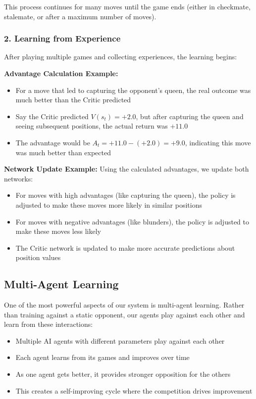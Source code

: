 \documentclass[11pt]{article}
\begin{document}
This process continues for many moves until the game ends (either in checkmate, stalemate, or after a maximum number of moves).

\subsubsection*{2. Learning from Experience}

After playing multiple games and collecting experiences, the learning begins:

\textbf{Advantage Calculation Example:}
\begin{itemize}
    \item For a move that led to capturing the opponent's queen, the real outcome was much better than the Critic predicted
    \item Say the Critic predicted $V(s_t) = +2.0$, but after capturing the queen and seeing subsequent positions, the actual return was $+11.0$
    \item The advantage would be $A_t = +11.0 - (+2.0) = +9.0$, indicating this move was much better than expected
\end{itemize}

\textbf{Network Update Example:}
Using the calculated advantages, we update both networks:

\begin{itemize}
    \item For moves with high advantages (like capturing the queen), the policy is adjusted to make these moves more likely in similar positions
    \item For moves with negative advantages (like blunders), the policy is adjusted to make these moves less likely
    \item The Critic network is updated to make more accurate predictions about position values
\end{itemize}

\subsection{Multi-Agent Learning}

One of the most powerful aspects of our system is multi-agent learning. Rather than training against a static opponent, our agents play against each other and learn from these interactions:

\begin{itemize}
    \item Multiple AI agents with different parameters play against each other
    \item Each agent learns from its games and improves over time
    \item As one agent gets better, it provides stronger opposition for the others
    \item This creates a self-improving cycle where the competition drives improvement
\end{itemize}
\end{document}
